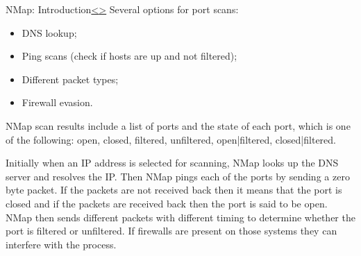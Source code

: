 \documentclass[12pt]{article}
\newenvironment{instructionblock}{\Large\bgroup}{\egroup}
\newcommand{\bi}{\begin{itemize}}
\newcommand{\ei}{\end{itemize}}
\begin{document}


\pagebreak
\begin{slide}{ NMap: Introduction}{\hyperref[slide 3]{\textless}\hyperref[slide 5]{\textgreater}}
   \begin{instructionblock}
 Several options for port scans:
         \bi
         \item DNS lookup;
         \item Ping scans (check if hosts are up and not filtered);
         \item Different packet types;
         \item Firewall evasion.
         \ei
 NMap scan results include a list of ports and the state of each port, which is one of the following: open, closed, filtered, unfiltered, open|filtered, closed|filtered.
\end{instructionblock}
\end{slide}

Initially when an IP address is selected for scanning,  NMap looks up the DNS server and resolves the IP. Then  NMap pings each of the ports by sending a zero byte packet. If the packets are not received back then it means that the port is closed and if the packets are received back then the port is said to be open.  NMap then sends different packets with different timing to determine whether the port is filtered or unfiltered. If firewalls are present on those systems they can interfere with the process.\\

\end{document}
